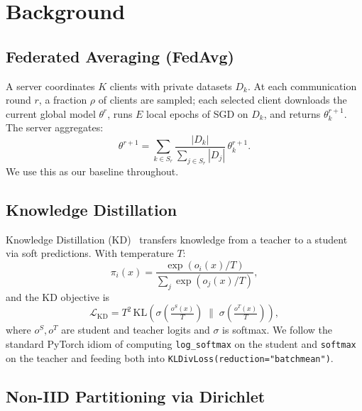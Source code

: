 \documentclass[journal]{IEEEtran}
\begin{document}
\section{Background}
\label{sec:background}

\subsection{Federated Averaging (FedAvg)}

A server coordinates $K$ clients with private datasets $D_k$. At
each communication round $r$, a fraction $\rho$ of clients are
sampled; each selected client downloads the current global model
$\theta^{r}$, runs $E$ local epochs of SGD on $D_k$, and returns
$\theta_k^{r+1}$. The server aggregates:
\begin{equation}
    \theta^{r+1} = \sum_{k\in S_r} \frac{|D_k|}{\sum_{j\in S_r}|D_j|}\,
    \theta_k^{r+1}.
\end{equation}
We use this as our baseline throughout.

\subsection{Knowledge Distillation}

Knowledge Distillation (KD)~\cite{hinton_kd} transfers knowledge from a
teacher to a student via soft predictions. With temperature $T$:
\begin{equation}
    \pi_i(x) = \frac{\exp(o_i(x)/T)}{\sum_j \exp(o_j(x)/T)},
\end{equation}
and the KD objective is
\begin{equation}
    \mathcal{L}_{\textrm{KD}} = T^2\,
    \mathrm{KL}\!\left(\sigma\!\left(\tfrac{o^{S}(x)}{T}\right)\;\big\|\;
    \sigma\!\left(\tfrac{o^{T}(x)}{T}\right)\right),
\end{equation}
where $o^{S}, o^{T}$ are student and teacher logits and $\sigma$ is
softmax. We follow the standard PyTorch idiom of computing
\texttt{log\_softmax} on the student and \texttt{softmax} on the
teacher and feeding both into \texttt{KLDivLoss(reduction="batchmean")}.

\subsection{Non-IID Partitioning via Dirichlet}
\end{document}
